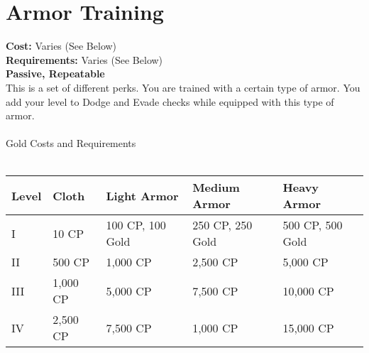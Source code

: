 \section{Armor Training}
\textbf{Cost:} Varies (See Below)\\
\textbf{Requirements:} Varies (See Below)\\
\textbf{Passive, Repeatable}\\
This is a set of different perks. You are trained with a certain type of armor. You add your level to Dodge and Evade checks while equipped with this type of armor.\\
\\
Gold Costs and Requirements\\
\\
\begin{tabular}{l | p{2cm} | p{2.4cm} | p{2.6cm} | p{2.6cm}}
	Level & Cloth & Light Armor & Medium Armor & Heavy Armor\\ \hline
	I & 10 CP & 100 CP, 100 Gold & 250 CP, 250 Gold & 500 CP, 500 Gold\\
	II & 500 CP& 1,000 CP & 2,500 CP & 5,000 CP\\
	III & 1,000 CP& 5,000 CP & 7,500 CP & 10,000 CP\\
	IV & 2,500 CP& 7,500 CP & 1,000 CP & 15,000 CP\\
\end{tabular}
